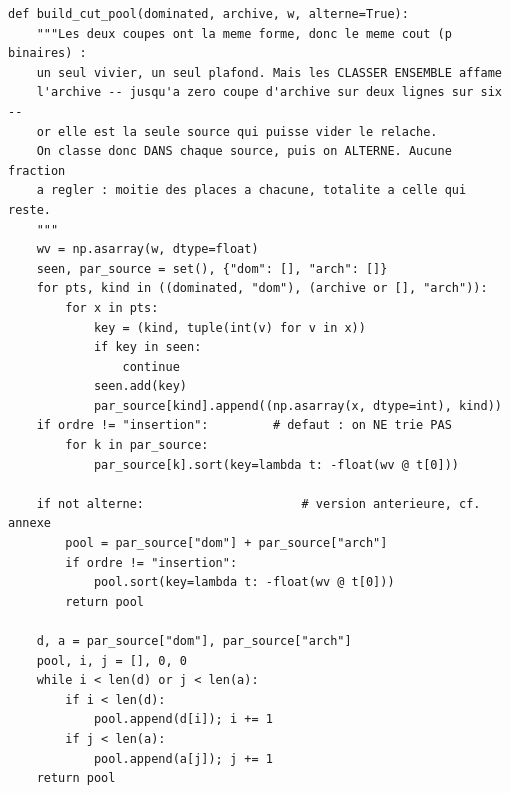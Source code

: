 \documentclass[11pt,a4paper]{article}
\theoremstyle{plain}
\theoremstyle{remark}
\begin{document}
\begin{lstlisting}[caption={Le vivier unique : deux sources, un plafond, et
l'\textbf{alternance} qui garantit des places a l'archive
(Alg.~\ref{alg:vivier}).},label={lst:vivier}]
def build_cut_pool(dominated, archive, w, alterne=True):
    """Les deux coupes ont la meme forme, donc le meme cout (p binaires) :
    un seul vivier, un seul plafond. Mais les CLASSER ENSEMBLE affame
    l'archive -- jusqu'a zero coupe d'archive sur deux lignes sur six --
    or elle est la seule source qui puisse vider le relache.
    On classe donc DANS chaque source, puis on ALTERNE. Aucune fraction
    a regler : moitie des places a chacune, totalite a celle qui reste.
    """
    wv = np.asarray(w, dtype=float)
    seen, par_source = set(), {"dom": [], "arch": []}
    for pts, kind in ((dominated, "dom"), (archive or [], "arch")):
        for x in pts:
            key = (kind, tuple(int(v) for v in x))
            if key in seen:
                continue
            seen.add(key)
            par_source[kind].append((np.asarray(x, dtype=int), kind))
    if ordre != "insertion":         # defaut : on NE trie PAS
        for k in par_source:
            par_source[k].sort(key=lambda t: -float(wv @ t[0]))

    if not alterne:                      # version anterieure, cf. annexe
        pool = par_source["dom"] + par_source["arch"]
        if ordre != "insertion":
            pool.sort(key=lambda t: -float(wv @ t[0]))
        return pool

    d, a = par_source["dom"], par_source["arch"]
    pool, i, j = [], 0, 0
    while i < len(d) or j < len(a):
        if i < len(d):
            pool.append(d[i]); i += 1
        if j < len(a):
            pool.append(a[j]); j += 1
    return pool
\end{lstlisting}
\end{document}

